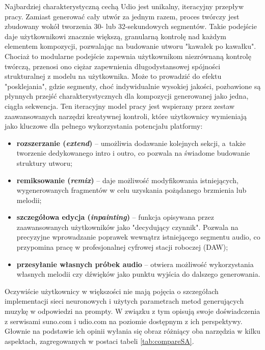 Najbardziej charakterystyczną cechą Udio jest unikalny, iteracyjny przepływ pracy. Zamiast generować cały utwór za jednym razem, proces twórczy jest zbudowany wokół tworzenia 30- lub 32-sekundowych segmentów. Takie podejście daje użytkownikowi znacznie większą, granularną kontrolę nad każdym elementem kompozycji, pozwalając na budowanie utworu "kawałek po kawałku". Chociaż to modularne podejście zapewnia użytkownikom niezrównaną kontrolę twórczą, przenosi ono ciężar zapewnienia długodystansowej spójności strukturalnej z modelu na użytkownika. Może to prowadzić do efektu "posklejania", gdzie segmenty, choć indywidualnie wysokiej jakości, pozbawione są płynnych przejść charakterystycznych dla kompozycji generowanej jako jedna, ciągła sekwencja.
Ten iteracyjny model pracy jest wspierany przez zestaw zaawansowanych narzędzi kreatywnej kontroli, które użytkownicy wymieniają jako kluczowe dla pełnego wykorzystania potencjału platformy:
\begin{itemize}
    \item \textbf{rozszerzanie (\textit{extend})} -- umożliwia dodawanie kolejnych sekcji, a~także tworzenie dedykowanego intro i outro, co pozwala na świadome budowanie struktury utworu;
    \item \textbf{remiksowanie (\textit{remix})} -- daje możliwość modyfikowania istniejących, wygenerowanych fragmentów w celu uzyskania pożądanego brzmienia lub melodii;
    \item \textbf{szczegółowa edycja (\textit{inpainting})} -- funkcja opisywana przez zaawansowanych użytkowników jako "decydujący czynnik". Pozwala na precyzyjne wprowadzanie poprawek wewnątrz istniejącego segmentu audio, co przypomina pracę w profesjonalnej cyfrowej stacji roboczej (DAW);
    \item \textbf{przesyłanie własnych próbek audio} -- otwiera możliwość wykorzystania własnych melodii czy dźwięków jako punktu wyjścia do dalszego generowania.
\end{itemize}

Oczywiście użytkownicy w większości nie mają pojęcia o szczegółach implementacji sieci neuronowych i użytych parametrach metod generujących muzykę w odpowiedzi na prompty. W związku z tym opisują swoje doświadczenia z serwisami suno.com i udio.com na poziomie dostępnym z ich perspektywy. Głownie na podstawie ich opinii wyłania się obraz różniący oba narzędzia w kilku aspektach, zagregowanych w postaci tabeli \ref{tab:compareSA}.

